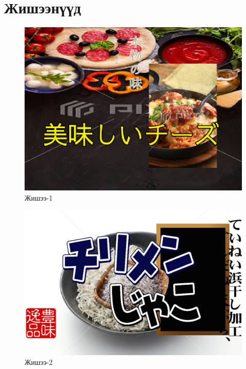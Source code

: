 \appendix
{}

\chapter{Жишээнүүд}
\begin{figure}
	\centering
	\includegraphics[scale=2]{src/pictures/zurag1.png}
	\caption{Жишээ-1}
\end{figure}
\begin{figure}
	\centering
	\includegraphics[scale=2]{src/pictures/zurag2.png}
	\caption{Жишээ-2}
\end{figure}

